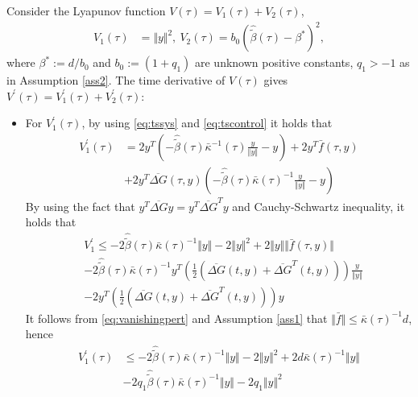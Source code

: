 \documentclass[twocolumn]{autart}    %
\begin{document}
Consider the Lyapunov function $V(\tau)=V_1(\tau)+V_2(\tau)$,
\begin{equation}\label{eq:lyap_fun}
\begin{aligned}
V_1(\tau)&=\Vert y \Vert^2,\:V_2(\tau)=b_0(\hat{\tilde{\beta}}(\tau)-\beta^*)^2,
\end{aligned}
\end{equation} where $\beta^*:=d/b_0$ and $b_0:=(1+q_1)$ are unknown positive constants, $q_1>-1$ as in Assumption \ref{ass2}. The time derivative of $V(\tau)$ gives $V^{'}(\tau)=V_1^{'}(\tau)+V_2^{'}(\tau)$:
\begin{itemize}
\item For $V_1^{'}(\tau)$, by using  \eqref{eq:tssys} and \eqref{eq:tscontrol} it holds that
\begin{equation*}
\begin{aligned}
V_1^{'}(\tau)&=2{y}^T(-\hat{\tilde{\beta}}(\tau)\bar{\kappa}^{-1}(\tau)\tfrac{y}{\Vert y \Vert}-y)+2{y}^T\bar{f}(\tau,y)\\
&+2{y}^T\overline{\Delta G}(\tau,y)(-\hat{\tilde{\beta}}(\tau)\bar{\kappa}(\tau)^{-1}\tfrac{y}{\Vert y \Vert}- {y})
\end{aligned}
\end{equation*} By using the fact that ${y}^T\overline{\Delta G}{y}={y}^T\overline{\Delta G}^T{y}$ and Cauchy-Schwartz inequality, it holds that
\begin{equation*}
\begin{aligned}
&V_1^{'}\leq-2\hat{\tilde{\beta}}(\tau)\bar{\kappa}(\tau)^{-1}\Vert {y}\Vert-2 \Vert {y}\Vert^2+2\Vert {y}\Vert \Vert \bar{f}(\tau,y) \Vert\\
&-2\hat{\tilde{\beta}}(\tau)\bar{\kappa}(\tau)^{-1}y^T(\tfrac{1}{2}(\overline{\Delta G}(t,y)+\overline{\Delta G}^T(t,y)))\tfrac{y}{\Vert y \Vert}\\
&-2y^T(\tfrac{1}{2}(\overline{\Delta G}(t,y)+\overline{\Delta G}^T(t,y))){y}
\end{aligned}
\end{equation*} It follows from \eqref{eq:vanishingpert} and Assumption \ref{ass1} that $\Vert \bar{f} \Vert \leq \bar{\kappa}(\tau)^{-1}d$, hence
\begin{equation}\label{eq:V1bound}
\begin{aligned}
V_1^{'}(\tau)&\leq -2\hat{\tilde{\beta}}(\tau)\bar{\kappa}(\tau)^{-1}\Vert {y} \Vert-2\Vert {y}\Vert^2+2d\bar{\kappa}(\tau)^{-1} \Vert {y} \Vert\\
&-2q_1\hat{\tilde{\beta}}(\tau)\bar{\kappa}(\tau)^{-1}\Vert {y} \Vert-2q_1\Vert y \Vert^2\\

\end{aligned}
\end{equation}
\end{itemize}
\end{document}
